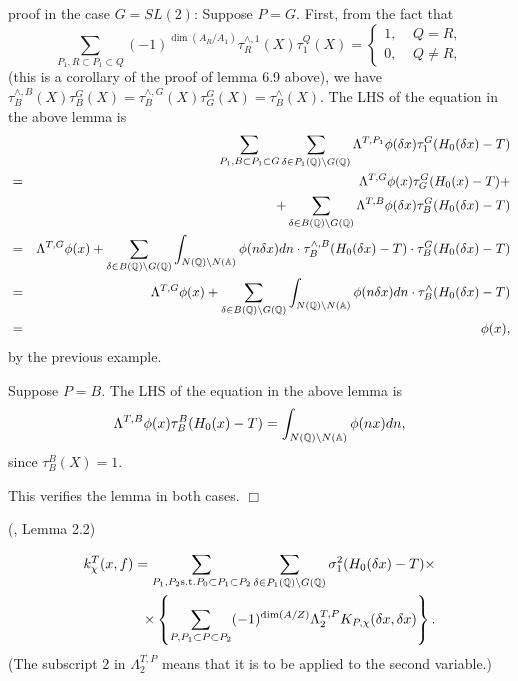 proof in the case $G=SL(2)$: Suppose $P=G$. First, from the fact that 
\begin{equation}
\sum_{ P_1 , R\subset P_1\subset Q}
 (-1)^{\dim (A_R/A_1)}\tau_R^{\wedge ,1}(X)\tau _1^Q(X)
=\left\{ 
\begin{array}{c}
1,\;\;\;\;Q=R, \\ 
0,\;\;\;\;Q\neq R,
\end{array}
\right.
\end{equation}
(this is a corollary of the proof of lemma 6.9 above), we have $\tau
_B^{\wedge ,B}(X)\tau _B^G(X)=\tau _B^{\wedge ,G}(X)\tau _G^G(X)=\tau
_B^{\wedge }(X)$. The LHS of the equation in the above lemma is 
\begin{eqnarray*}
&&\sum_{ P_1, B\subset P_1\subset G } 
\sum_{\delta \in P_1(\qqq )\backslash G(\qqq )}
\Lambda ^{T,P_1}\phi (\delta x)\tau _1^G(H_0(\delta x)-T) \\
&=&\Lambda ^{T,G}\phi (x)\tau _G^G(H_0(x)-T)+ \\
&&+\sum_{\delta \in B(\qqq )\backslash G(\qqq )}\Lambda ^{T,B}\phi
(\delta x)\tau _B^G(H_0(\delta x)-T) \\
&=&\Lambda ^{T,G}\phi (x)+\sum_{\delta \in B(\qqq )\backslash G(\qqq %
)}\int_{N(\qqq )\backslash N(\aaa )}\phi (n\delta x)dn\cdot \tau
_B^{\wedge ,B}(H_0(\delta x)-T)\cdot \tau _B^G(H_0(\delta x)-T) \\
&=&\Lambda ^{T,G}\phi (x)+\sum_{\delta \in B(\qqq )\backslash G(\qqq %
)}\int_{N(\qqq )\backslash N(\aaa )}\phi (n\delta x)dn\cdot \tau
_B^{\wedge }(H_0(\delta x)-T) \\
&=&\phi (x),
\end{eqnarray*}
by the previous example.

Suppose $P=B$. The LHS of the equation in the above lemma is 
\[
\Lambda ^{T,B}\phi (x)\tau _B^B(H_0(x)-T)
=\int_{N(\mathbb{Q} )\backslash N(\mathbb{A})}\phi (nx)dn, 
\]
since $\tau _B^B(X)=1$.

This verifies the lemma in both cases. $\Box $

\begin{lemma}
(\cite{A3}, Lemma 2.2)

\begin{eqnarray*}
k_\chi ^T(x,f)=\sum_{ P_1,P_2 {\rm s.t.} P_0\subset P_1\subset P_2}
\sum_{\delta \in P_1(\mathbb{Q} )\backslash G(\mathbb{Q} )}
\sigma _1^2(H_0(\delta x)-T)\times  \\
\times \left\{ \sum_{ P, P_1\subset P\subset P_2 }
(-1)^{\dim (A/Z)}\Lambda _2^{T,P}K_{P,\chi }(\delta x,\delta x)\right\} .
\end{eqnarray*}
(The subscript $2$ in $\Lambda _2^{T,P}$ means that it is to be applied to
the second variable.)
\end{lemma}

